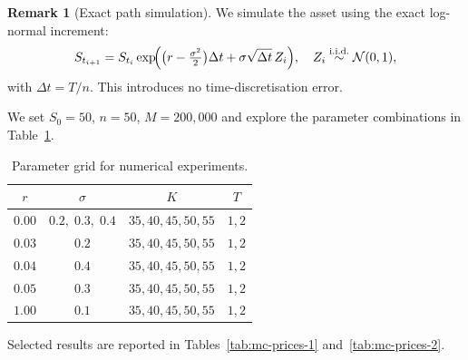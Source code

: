 \documentclass[11pt,a4paper]{article}
\theoremstyle{plain}
\theoremstyle{definition}
\newtheorem{remark}[theorem]{Remark}
\begin{document}
\begin{remark}[Exact path simulation]
We simulate the asset using the exact log-normal increment:
\[
  S_{t_{i+1}} = S_{t_i}
  \exp\!\Bigl(\bigl(r-\tfrac{\sigma^2}{2}\bigr)\Delta t
              + \sigma\sqrt{\Delta t}\,Z_i\Bigr),
  \quad Z_i \overset{\text{i.i.d.}}{\sim}\mathcal{N}(0,1),
\]
with $\Delta t = T/n$. This introduces no time-discretisation error.
\end{remark}

We set $S_0 = 50$, $n = 50$, $M = 200{,}000$ and explore the parameter
combinations in Table~\ref{tab:params}.

\begin{table}[H]
  \centering
  \caption{Parameter grid for numerical experiments.}
  \label{tab:params}
  \begin{tabular}{cccc}
    \toprule
    $r$ & $\sigma$ & $K$ & $T$ \\
    \midrule
    $0.00$ & $0.2,\;0.3,\;0.4$ & $35,40,45,50,55$ & $1,2$ \\
    $0.03$ & $0.2$              & $35,40,45,50,55$ & $1,2$ \\
    $0.04$ & $0.4$              & $35,40,45,50,55$ & $1,2$ \\
    $0.05$ & $0.3$              & $35,40,45,50,55$ & $1,2$ \\
    $1.00$ & $0.1$              & $35,40,45,50,55$ & $1,2$ \\
    \bottomrule
  \end{tabular}
\end{table}

Selected results are reported in Tables~\ref{tab:mc-prices-1} and~\ref{tab:mc-prices-2}.
\end{document}
